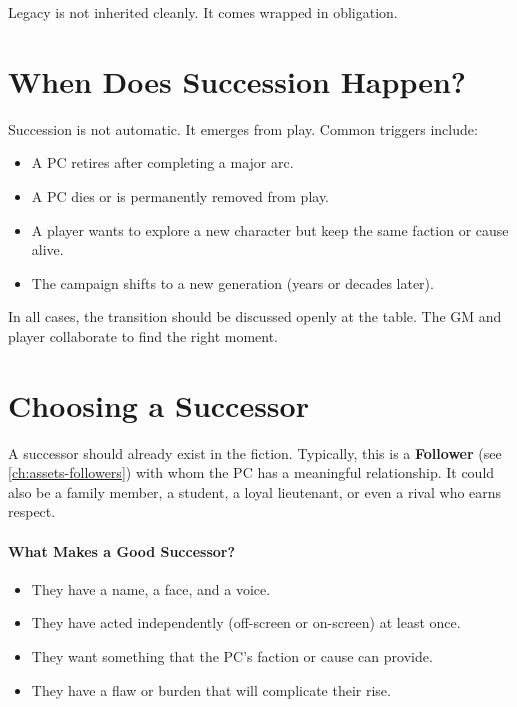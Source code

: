 Legacy is not inherited cleanly. It comes wrapped in obligation.

\section{When Does Succession Happen?}
\label{sec:succession-triggers}

Succession is not automatic. It emerges from play. Common triggers include:

\begin{itemize}
  \item A PC retires after completing a major arc.
  \item A PC dies or is permanently removed from play.
  \item A player wants to explore a new character but keep the same faction or cause alive.
  \item The campaign shifts to a new generation (years or decades later).
\end{itemize}

In all cases, the transition should be discussed openly at the table. The GM and player collaborate to find the right moment.

\section{Choosing a Successor}
\label{sec:choosing-successor}

A successor should already exist in the fiction. Typically, this is a \textbf{Follower} (see \ref{ch:assets-followers}) with whom the PC has a meaningful relationship. It could also be a family member, a student, a loyal lieutenant, or even a rival who earns respect.

\paragraph{What Makes a Good Successor?}
\begin{itemize}
  \item They have a name, a face, and a voice.
  \item They have acted independently (off-screen or on-screen) at least once.
  \item They want something that the PC's faction or cause can provide.
  \item They have a flaw or burden that will complicate their rise.
\end{itemize}


